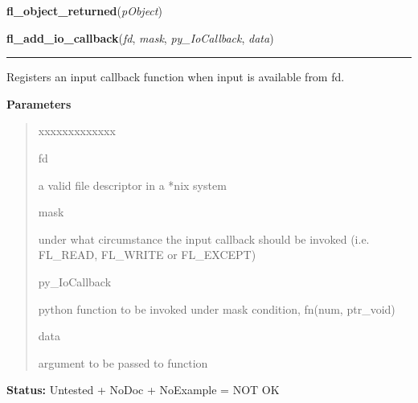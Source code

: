     \label{xformslib:library:fl_object_returned}

    \vspace{0.5ex}

\hspace{.8\funcindent}\begin{boxedminipage}{\funcwidth}

    \raggedright \textbf{fl\_object\_returned}(\textit{pObject})

\setlength{\parskip}{2ex}
\setlength{\parskip}{1ex}
    \end{boxedminipage}

    \label{xformslib:library:fl_add_io_callback}

    \vspace{0.5ex}

\hspace{.8\funcindent}\begin{boxedminipage}{\funcwidth}

    \raggedright \textbf{fl\_add\_io\_callback}(\textit{fd}, \textit{mask}, \textit{py\_IoCallback}, \textit{data})

    \vspace{-1.5ex}

    \rule{\textwidth}{0.5\fboxrule}
\setlength{\parskip}{2ex}
    Registers an input callback function when input is available from fd.

\setlength{\parskip}{1ex}
      \textbf{Parameters}
      \vspace{-1ex}

      \begin{quote}
        \begin{Ventry}{xxxxxxxxxxxxx}

          \item[fd]

          a valid file descriptor in a *nix system

          \item[mask]

          under what circumstance the input callback should be invoked 
          (i.e. FL\_READ, FL\_WRITE or FL\_EXCEPT)

          \item[py\_IoCallback]

          python function to be invoked under mask condition, fn(num, 
          ptr\_void)

          \item[data]

          argument to be passed to function

        \end{Ventry}

      \end{quote}

\textbf{Status:} Untested + NoDoc + NoExample = NOT OK



    \end{boxedminipage}

